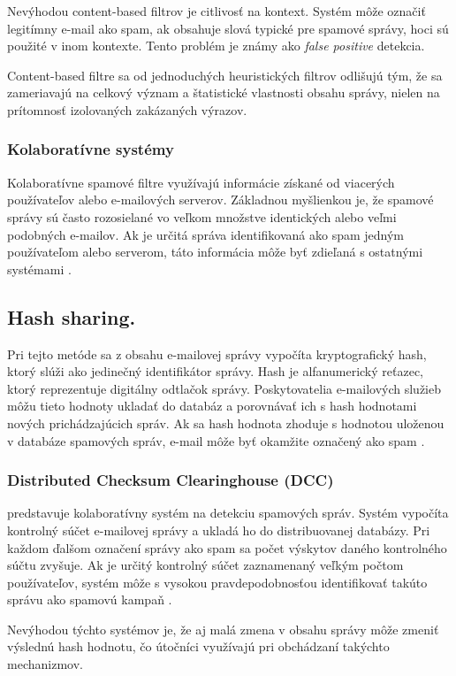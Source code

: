 \documentclass[conference]{IEEEtran}
\begin{document}
Nevýhodou content-based filtrov je citlivosť na kontext.
Systém môže označiť legitímny e-mail ako spam,
ak obsahuje slová typické pre spamové správy,
hoci sú použité v inom kontexte. Tento problém je
známy ako \textit{false positive} detekcia.

Content-based filtre sa od jednoduchých heuristických filtrov odlišujú tým,
že sa zameriavajú na celkový význam a štatistické vlastnosti obsahu správy,
nielen na prítomnosť izolovaných zakázaných výrazov.
\subsubsection*{Kolaboratívne systémy}

Kolaboratívne spamové filtre využívajú informácie získané
od viacerých používateľov alebo e-mailových serverov.
Základnou myšlienkou je, že spamové správy sú často
rozosielané vo veľkom množstve identických alebo veľmi
podobných e-mailov. Ak je určitá správa identifikovaná
ako spam jedným používateľom alebo serverom, táto
informácia môže byť zdieľaná s ostatnými systémami
\cite{karim2019spam}.

\subsection*{Hash sharing.}
Pri tejto metóde sa z obsahu e-mailovej správy vypočíta
kryptografický hash, ktorý slúži ako jedinečný identifikátor
správy. Hash je alfanumerický reťazec, ktorý reprezentuje
digitálny odtlačok správy. Poskytovatelia e-mailových služieb
môžu tieto hodnoty ukladať do databáz a porovnávať ich
s hash hodnotami nových prichádzajúcich správ. Ak sa hash
hodnota zhoduje s hodnotou uloženou v databáze spamových
správ, e-mail môže byť okamžite označený ako spam
\cite{karim2019spam}.

\subsubsection*{Distributed Checksum Clearinghouse (DCC)}predstavuje
kolaboratívny systém na detekciu spamových správ.
Systém vypočíta kontrolný súčet e-mailovej správy
a ukladá ho do distribuovanej databázy. Pri každom
ďalšom označení správy ako spam sa počet výskytov
daného kontrolného súčtu zvyšuje. Ak je určitý kontrolný
súčet zaznamenaný veľkým počtom používateľov,
systém môže s vysokou pravdepodobnosťou identifikovať
takúto správu ako spamovú kampaň \cite{jakobsson2007phishing,karim2019spam}.

Nevýhodou týchto systémov je, že aj malá zmena v obsahu správy môže
zmeniť výslednú hash hodnotu, čo útočníci využívajú pri obchádzaní
takýchto mechanizmov.
\end{document}
